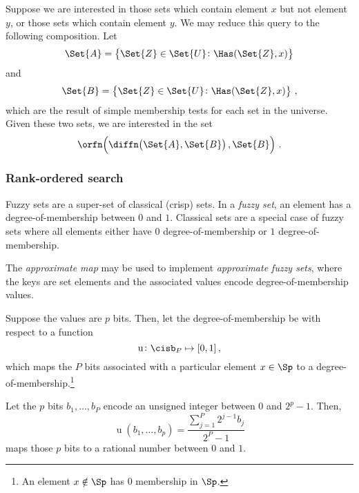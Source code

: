 \documentclass[ ../main.tex]{subfiles}
\begin{document}
\begin{example}
Suppose we are interested in those sets which contain element $x$ but not element $y$, or those sets which contain element $y$. We may reduce this query to the following composition. Let
\begin{equation*}
    \Set{A} = \left\{ \Set{Z} \in \Set{U} \colon \Has(\Set{Z}, x) \right\}
\end{equation*}
and
\begin{equation*}
    \Set{B} = \left\{ \Set{Z} \in \Set{U} \colon \Has(\Set{Z}, x) \right\}\,,
\end{equation*}
which are the result of simple membership tests for each set in the universe. Given these two sets, we are interested in the set
\begin{equation*}
    \orfn\!\left(\diffn\!\left(\Set{A}, \Set{B}\right), \Set{B}\right)\,.
\end{equation*}
\end{example}

\subsubsection{Rank-ordered search}
\label{sec:extensions:fuzzyset}
Fuzzy sets are a super-set of  classical (crisp) sets. In a \emph{fuzzy set}, an element has a degree-of-membership between $0$ and $1$. Classical sets are a special case of fuzzy sets where all elements either have $0$ degree-of-membership or $1$ degree-of-membership.

The \emph{approximate map} may be used to implement \emph{approximate fuzzy sets}, where the keys are set elements and the associated values encode degree-of-membership values.

Suppose the values are $p$ bits. Then, let the degree-of-membership be with respect to a function
\begin{equation}
    \operatorname{u} \colon \cisb_P \mapsto [0,1]\,,
\end{equation}
which maps the $P$ bits associated with a particular element $x \in \Sp$ to a degree-of-membership.\footnote{An element $x \notin \Sp$ has $0$ membership in $\Sp$.}
\begin{example}
Let the $p$ bits $b_1, \ldots, b_P$ encode an unsigned integer between $0$ and $2^p-1$. Then,
\begin{equation}
    \operatorname{u}\!\left(b_1, \ldots, b_p\right) = \frac{\sum_{j=1}^{P} 2^{j-1} b_j}{2^P-1}
\end{equation}
maps those $p$ bits to a rational number between $0$ and $1$.
\end{example}
\end{document}
